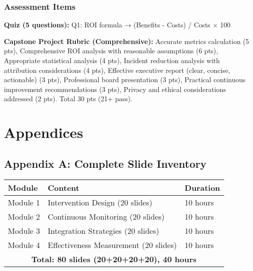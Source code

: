\documentclass[11pt,a4paper]{article}
\begin{document}
\subsubsection{Assessment Items}

\textbf{Quiz (5 questions):} Q1: ROI formula → (Benefits - Costs) / Costs × 100%

\textbf{Capstone Project Rubric (Comprehensive):} Accurate metrics calculation (5 pts), Comprehensive ROI analysis with reasonable assumptions (6 pts), Appropriate statistical analysis (4 pts), Incident reduction analysis with attribution considerations (4 pts), Effective executive report (clear, concise, actionable) (3 pts), Professional board presentation (3 pts), Practical continuous improvement recommendations (3 pts), Privacy and ethical considerations addressed (2 pts). Total 30 pts (21+ pass).

\newpage

\section{Appendices}

\subsection{Appendix A: Complete Slide Inventory}

\begin{longtable}{|p{2.5cm}|p{8cm}|p{3cm}|}
\hline
\textbf{Module} & \textbf{Content} & \textbf{Duration} \\
\hline
\endhead

Module 1 & Intervention Design (20 slides) & 10 hours \\
Module 2 & Continuous Monitoring (20 slides) & 10 hours \\
Module 3 & Integration Strategies (20 slides) & 10 hours \\
Module 4 & Effectiveness Measurement (20 slides) & 10 hours \\
\hline

\multicolumn{3}{|c|}{\textbf{Total: 80 slides (20+20+20+20), 40 hours}} \\
\hline

\end{longtable}
\end{document}

